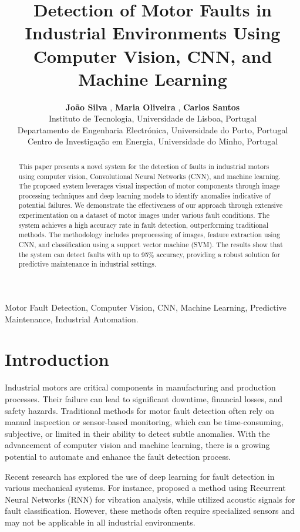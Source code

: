 \documentclass[conference]{IEEEtran}
\title{\textbf{Detection of Motor Faults in Industrial Environments Using Computer Vision, CNN, and Machine Learning}}
\author{%
    \textbf{João Silva} \IEEauthorrefmark{1}, \textbf{Maria Oliveira} \IEEauthorrefmark{2}, \textbf{Carlos Santos} \IEEauthorrefmark{3} \\
    \IEEauthorrefmark{1} Instituto de Tecnologia, Universidade de Lisboa, Portugal \\
    \IEEauthorrefmark{2} Departamento de Engenharia Electrónica, Universidade do Porto, Portugal \\
    \IEEauthorrefmark{3} Centro de Investigação em Energia, Universidade do Minho, Portugal \\
    \email{\{joao.silva, maria.oliveira, carlos.santos\}@university.edu}
}
\affil{\footnotetext[1]{Corresponding author: joao.silva@university.edu}}
\date{}
\begin{document}
\maketitle

\begin{abstract}
    This paper presents a novel system for the detection of faults in industrial motors using computer vision, Convolutional Neural Networks (CNN), and machine learning. The proposed system leverages visual inspection of motor components through image processing techniques and deep learning models to identify anomalies indicative of potential failures. We demonstrate the effectiveness of our approach through extensive experimentation on a dataset of motor images under various fault conditions. The system achieves a high accuracy rate in fault detection, outperforming traditional methods. The methodology includes preprocessing of images, feature extraction using CNN, and classification using a support vector machine (SVM). The results show that the system can detect faults with up to 95\% accuracy, providing a robust solution for predictive maintenance in industrial settings.
\end{abstract}

\begin{IEEEkeywords}
    Motor Fault Detection, Computer Vision, CNN, Machine Learning, Predictive Maintenance, Industrial Automation.
\end{IEEEkeywords}

\section{Introduction}

Industrial motors are critical components in manufacturing and production processes. Their failure can lead to significant downtime, financial losses, and safety hazards. Traditional methods for motor fault detection often rely on manual inspection or sensor-based monitoring, which can be time-consuming, subjective, or limited in their ability to detect subtle anomalies. With the advancement of computer vision and machine learning, there is a growing potential to automate and enhance the fault detection process.

Recent research has explored the use of deep learning for fault detection in various mechanical systems. For instance, \cite{ref1} proposed a method using Recurrent Neural Networks (RNN) for vibration analysis, while \cite{ref2} utilized acoustic signals for fault classification. However, these methods often require specialized sensors and may not be applicable in all industrial environments.
\end{document}
